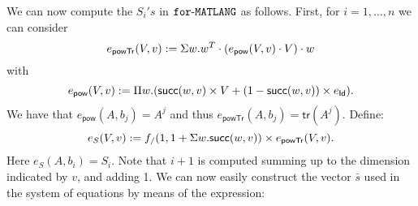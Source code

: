     We can now compute the $S_i's$ in $\texttt{for}\text{-}\texttt{MATLANG}$ as follows. First, for
    $i=1,\ldots,n$ we can consider
    $$
    e_{\mathsf{powTr}}(V,v):=\Sigma w. w^T\cdot\left(e_{\mathsf{pow}}(V,v)\cdot V\right)\cdot w
    $$
    with 
    $$
    e_{\mathsf{pow}}(V,v):= \Pi w. (\mathsf{succ}(w,v)\times V+(1-\mathsf{succ}(w,v))\times e_{\mathsf{Id}}).
    $$
    We have that $e_{\mathsf{pow}}(A,b_j)=A^{j}$ and thus $e_{\mathsf{powTr}}(A,b_j)=\mathsf{tr}(A^{j})$. Define:
    $$
    e_{S}(V,v):=f_{/}(1, 1 + \Sigma w. \mathsf{succ}(w,v))\times e_{\mathsf{powTr}}(V,v).
    $$
    Here $e_{S}(A,b_i)=S_i$. Note that $i+1$ is computed summing up to the dimension indicated by $v$, and adding 1.
    We can now easily construct the vector $\bar s$ used in the system of equations by means of the expression:
